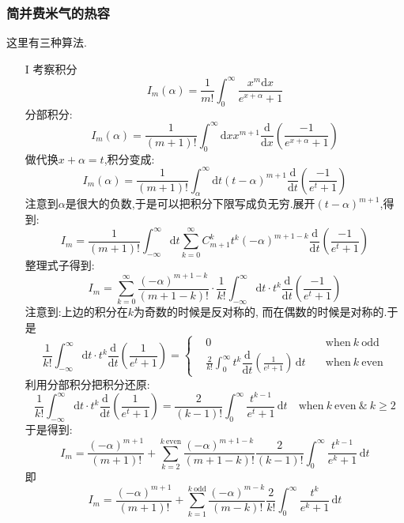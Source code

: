 \subsubsection{简并费米气的热容}
    这里有三种算法.
    \begin{itemize}
      \item[I]
        考察积分
        \[I_m(\alpha)=\frac{1}{m!}\int_0 ^{\infty}\dfrac{x^{m}\mathrm{d} x}{e^{x+\alpha}+1}\]
        分部积分:
        \[I_m(\alpha)=\frac{1}{(m+1)!}\int_0^{\infty}\mathrm{d} x x^{m+1} \dfrac{\mathrm{d}}{\mathrm{d} x}\left( \frac{-1}{e^{x+\alpha}+1} \right) \]
        做代换$x+\alpha=t$,积分变成:
        \[I_m(\alpha)=\frac{1}{(m+1)!}\int_{\alpha}^{\infty}\mathrm{d} t (t-\alpha)^{m+1} \dfrac{\mathrm{d}}{\mathrm{d} t}\left( \frac{-1}{e^{t}+1} \right) \]
        注意到$\alpha$是很大的负数,于是可以把积分下限写成负无穷.展开$(t-\alpha)^{m+1}$,得到:
        \[I_m=\frac{1}{(m+1)!}\int_{-\infty}^{\infty}\mathrm{d} t \sum_{k=0}^{\infty}C_{m+1}^{k} t^{k}(-\alpha)^{m+1-k} \dfrac{\mathrm{d}}{\mathrm{d} t}\left( \frac{-1}{e^{t}+1} \right) \]
        整理式子得到:
        \[I_m=\sum_{k=0}^{\infty}\frac{(-\alpha )^{m+1-k}}{(m+1-k)!}\cdot \frac{1}{k!}\int_{-\infty}^{\infty} \mathrm{d} t\cdot t ^{k}\dfrac{\mathrm{d}}{\mathrm{d} t}\left( \frac{-1}{e^{t}+1} \right) \]
        注意到:上边的积分在$k$为奇数的时候是反对称的, 而在偶数的时候是对称的.于是 
        \[
          \frac{1}{k!} \int_{-\infty}^{\infty} \mathrm{d} t \cdot t^{k} \dfrac{\mathrm{d}}{\mathrm{d} t}\left( \frac{1}{e^{t}+1} \right) =\left\{  
            \begin{aligned}
              &0 \quad&\text{when}~k~\text{odd}\\
            &\frac{2}{k!}\int_{0}^{\infty} t^{k} \dfrac{\mathrm{d}}{\mathrm{d} t}\left( \frac{1}{e^{t}+1} \right)  \, \mathrm{d}t \quad&\text{when}~k~\text{even}
           \end{aligned}
          \right.
         \]
        利用分部积分把积分还原:
        \[\frac{1}{k!}\int_{-\infty}^{\infty} \mathrm{d} t\cdot t ^{k}\dfrac{\mathrm{d}}{\mathrm{d} t}\left( \frac{1}{e^{t}+1} \right)=\frac{2}{(k-1)!}\int_{0}^{\infty} \frac{t^{k-1}}{e^{t}+1}  \, \mathrm{d}t\quad\text{when}~k~\text{even}~ \& ~k\ge 2\]
        于是得到:
        \[I_m=\frac{(-\alpha)^{m+1}}{(m+1)!}+\sum_{k=2}^{k~\text{even}} \frac{(-\alpha)^{m+1-k}}{(m+1-k)!}\frac{2}{(k-1)!}\int_{0}^{\infty} \frac{t^{k-1}}{e^{k}+1} \, \mathrm{d}t\]
        即 
        \[I_m=\frac{(-\alpha)^{m+1}}{(m+1)!}+\sum_{k=1}^{k~\text{odd}} \frac{(-\alpha)^{m-k}}{(m-k)!}\frac{2}{k!}\int_{0}^{\infty} \frac{t^{k}}{e^{k}+1} \, \mathrm{d}t\]

\end{itemize}
